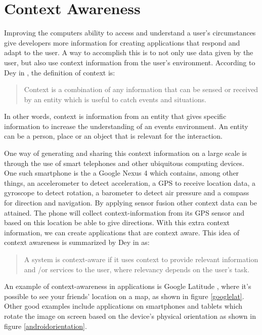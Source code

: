 \section{Context Awareness}
Improving the computers ability to access and understand a user's circumstances give developers more information for creating  applications that respond and adapt to the user. A way to accomplish this is to not only use data given by the user, but also use context information from the user's environment. According to Dey in \cite{dey2001understanding}, the definition of context is:

\begin{quotation}
\centering
Context is a combination of any information that can be sensed or received by an entity which is useful to catch events and situations.
\end{quotation}

In other words, context is information from an entity that gives specific information to increase the understanding of an events environment. An entity can be a person, place or an object that is relevant for the interaction. 

One way of generating and sharing this context information on a large scale is through the use of smart telephones and other ubiquitous computing devices. One such smartphone is the a Google Nexus 4 \cite{GoogleNexus} which contains, among other things, an accelerometer to detect acceleration, a GPS to receive location data, a gyroscope to detect rotation, a barometer to detect air pressure and a compass for direction and navigation. By applying sensor fusion \cite{Elmenreich02sensorfusion} other context data can be attained. The phone will collect context-information from its GPS sensor and based on this location be able to give directions. With this extra context information, we can create applications that are context aware. This idea of context awareness is summarized by Dey in \cite{dey2001understanding} as: 

\begin{quotation}
\centering
A system is context-aware if it uses context to provide relevant information and \slash or services to the user, where relevancy depends on the user's task.
\end{quotation}

An example of context-awareness in applications is Google Latitude \cite{GoogleLatitude}, where it's possible to see your friends' location on a map, as shown in figure \ref{googlelat}. Other good examples include applications on smartphones and tablets which rotate the image on screen based on the device's physical orientation as shown in figure \ref{androidorientation}.

